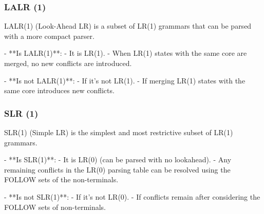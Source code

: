 \subsubsection{LALR (1)}
LALR(1) (Look-Ahead LR) is a subset of LR(1) grammars that can be parsed with a more compact parser.

- **Is LALR(1)**:
  - It is LR(1).
  - When LR(1) states with the same core are merged, no new conflicts are introduced.

- **Is not LALR(1)**:
  - If it's not LR(1).
  - If merging LR(1) states with the same core introduces new conflicts.


\subsubsection{SLR (1)}
SLR(1) (Simple LR) is the simplest and most restrictive subset of LR(1) grammars.

- **Is SLR(1)**:
  - It is LR(0) (can be parsed with no lookahead).
  - Any remaining conflicts in the LR(0) parsing table can be resolved using the FOLLOW sets of the non-terminals.

- **Is not SLR(1)**:
  - If it's not LR(0).
  - If conflicts remain after considering the FOLLOW sets of non-terminals.





